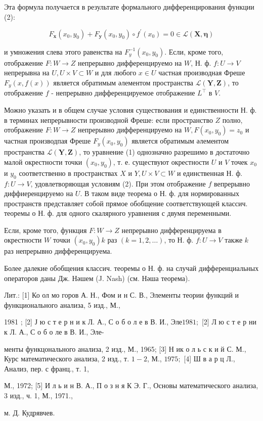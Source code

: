 \documentclass[10pt]{article}
\begin{document}
Эта формула получается в результате формального дифференцирования функции (2):



\[

F_{\boldsymbol{x}}\left(x_{0}, y_{0}\right)+F_{\boldsymbol{y}}\left(x_{0}, y_{0}\right) \circ f^{\prime}\left(x_{0}\right)=0 \in \mathscr{L}(\boldsymbol{X}, \boldsymbol{\eta})

\]



и умножения слева этого равенства на $F_{y}^{-1}\left(x_{0}, y_{0}\right)$. Если, кроме того, отображение $F: W \rightarrow Z$ непрерывно дифференцируемо на $W$, Н. ф. $f: U \rightarrow V$ непрерывна на $U, U \times V \subset W$ и для любого $x \in U$ частная производная Фреше $F_{y}(x, f(x))$ является обратимым әлементом пространства $\mathscr{L}(\boldsymbol{Y}, \boldsymbol{Z})$, то отображение $f$ - непрерывно дифференцируемое отображение $L^{\top}$ в $V$.



Можно указать и в общем случае условия существования и единственности Н. ф. в терминах непрерывности производной Фреше: если пространство $Z$ полно, отображение $F: W \rightarrow Z$ непрерывно дифференцируемо на $W, F\left(x_{0}, y_{0}\right)=z_{0}$ и частная производпая Фреше $F_{y}\left(x_{0}, y_{0}\right)$ является обратимым әлементом пространства $\mathscr{L}(\boldsymbol{Y}, \boldsymbol{Z})$, то уравнение (1) однозначно разрешимо в достаточно малой окрестности точки $\left(x_{0}, y_{0}\right)$, т. е. существуют окрестности $U$ и $V$ точек $x_{0}$ и $y_{0}$ соответственно в пространствах $X$ и $Y, U \times V \subset W$ и единственная Н. ф. $f: U \rightarrow V$, удовлетворяющая условиям (2). При этом отображение $f$ вепрерывно диффиеренцируемо на $U$. В таком виде теорема о Н. ф. для нормированных пространств представляет собой прямое обобщение соответствующей классич. теоремы о Н. ф. для одного скалярного уравнения с двумя переменными.



Если, кроме того, функция $F: W \rightarrow Z$ непрерывно дифференцируема в окрестности $W$ точки $\left(x_{0}, y_{0}\right) k$ раз $(k=1,2, \ldots)$, то Н. ф. $f: U \rightarrow V$ также $k$ раз непрерывно дифференцируема.



Более далекие обобщения классич. теоремы о Н. ф. на случай дифференциальных операторов даны Дж. Нәшем (J. Nash) (см. Нәша теорема).



Лит.: [1] Ко ол мо горов А. Н., Фом и н С. В., Элементы теории функций и функционального анализа, 5 изд., М.,

1981 ; [2] Ј ю с т е р н и к Л. А., С о б о л е в В. И., Эле$1981 ;$ [2] Л ю с т е р ни к Л. А., С о б о ле в В. И., Эле-

менты функцонального анализа, 2 изд., М., 1965; [3] Н ик о л ь с к и й С. М., Курс математического анализа, 2 изд., т. $1-2$, М., $1975 ;$ [4] Ш в а р ц Л., Анализ, пер. с франц., т. 1,

М., 1972; [5] И л ь и н В. А., П о з н я К Э. Г., Основы математического анализа, 3 изд., ч. 1, М., 1971.,

м. Д. Кудрявчев.
\end{document}
